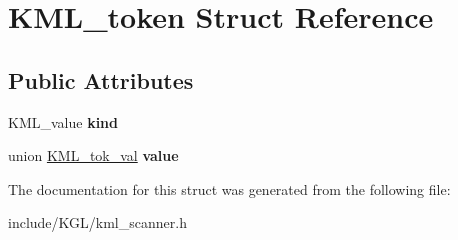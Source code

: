 \hypertarget{struct_k_m_l__token}{}\section{K\+M\+L\+\_\+token Struct Reference}
\label{struct_k_m_l__token}
\subsection*{Public Attributes}
\begin{DoxyCompactItemize}
\item 
\mbox{\label{struct_k_m_l__token_a1c047d3b708d7894e075963376ea112f}} 
K\+M\+L\+\_\+value {\bfseries kind}
\item 
\mbox{\label{struct_k_m_l__token_a1e665553539ca31e90fa9c518e48cf7f}} 
union \mbox{\hyperlink{union_k_m_l__tok__val}{K\+M\+L\+\_\+tok\+\_\+val}} {\bfseries value}
\end{DoxyCompactItemize}


The documentation for this struct was generated from the following file\+:\begin{DoxyCompactItemize}
\item 
include/\+K\+G\+L/kml\+\_\+scanner.\+h\end{DoxyCompactItemize}
